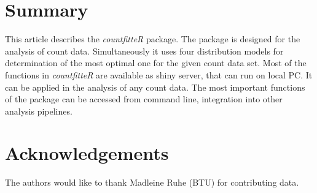 


\section{Summary}

This article describes the \emph{countfitteR} package. The package is designed for the analysis of count data. Simultaneously it uses four distribution models for determination of the most optimal one for the given count data set. 
Most of the functions in \emph{countfitteR} are available as shiny server, that can run on local PC. It can be applied in the analysis of any count data. The most important functions of the package can be accessed from command line, integration into other analysis pipelines.

\section{Acknowledgements}

The authors would like to thank Madleine Ruhe (BTU) for contributing data.



\address{Jaros\l{}aw Chilimoniuk\\
  University of Wroc\l{}aw\\
  Pl. Uniwersytecki 1, Wroc\l{}aw\\
  Poland\\
  ORCiD: 0000-0001-5467-018X\\
  }

\address{Stefan R\"{o}diger (corresponding author)\\
  Brandenburg University of Technology Cottbus - Senftenberg \&\\
  Faculty of Health Sciences, joint Faculty of the Brandenburg University of Technology Cottbus - Senftenberg, the Brandenburg Medical School Theodor Fontane and the University of Potsdam, Senftenberg, Germany\\
  Universit\"atsplatz 1, Senftenberg\\
  Germany\\
  ORCiD: 0000-0002-1441-6512\\
  }

\address{Micha\l{} Burdukiewicz (corresponding author)\\
  University of Wroc\l{}aw\\
  Pl. Uniwersytecki 1, Wroc\l{}aw\\
  Poland\\
  ORCiD: 0000-0001-8926-582X\\
  }
